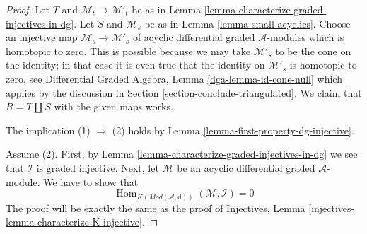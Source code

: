 \documentclass{stacks-project}
\theoremstyle{plain}
\theoremstyle{definition}
\theoremstyle{remark}
\numberwithin{equation}{subsection}
\def\Hom{\mathop{\mathrm{Hom}}\nolimits}
\begin{document}
\begin{proof}
Let $T$ and $\mathcal{M}_t \to \mathcal{M}'_t$ be as in
Lemma \ref{lemma-characterize-graded-injectives-in-dg}.
Let $S$ and $\mathcal{M}_s$ be as in
Lemma \ref{lemma-small-acyclics}.
Choose an injective map $\mathcal{M}_s \to \mathcal{M}'_s$
of acyclic differential graded $\mathcal{A}$-modules
which is homotopic to zero. This is possible because we
may take $\mathcal{M}'_s$ to be the cone on the identity;
in that case it is even true that the identity on
$\mathcal{M}'_s$ is homotopic to zero, see
Differential Graded Algebra, Lemma \ref{dga-lemma-id-cone-null} which
applies by the discussion in Section \ref{section-conclude-triangulated}.
We claim that $R = T \coprod S$ with the given maps works.

\medskip\noindent
The implication (1) $\Rightarrow$ (2) holds by
Lemma \ref{lemma-first-property-dg-injective}.

\medskip\noindent
Assume (2). First, by Lemma \ref{lemma-characterize-graded-injectives-in-dg}
we see that $\mathcal{I}$ is graded injective. Next, let
$\mathcal{M}$ be an acyclic differential graded $\mathcal{A}$-module.
We have to show that
$$
\Hom_{K(\textit{Mod}(\mathcal{A}, \text{d}))}(\mathcal{M}, \mathcal{I}) = 0
$$
The proof will be exactly the same as the proof of
Injectives, Lemma \ref{injectives-lemma-characterize-K-injective}.


\end{proof}
\end{document}

